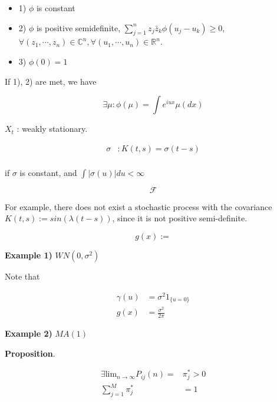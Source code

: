 \documentclass[12pt]{article}
\theoremstyle{nonumberbreak}
\begin{document}
\begin{itemize}
	\item 1) $\phi$ is constant
	\item 2) $\phi$ is positive semidefinite, $\sum_{j=1}^n z_j \bar{z}_k \phi(u_j - u_k) \ge 0$, $\forall (z_1, \cdots, z_n) \in \mathbb{C}^n, \forall (u_1, \cdots, u_n) \in \mathbb{R}^n$.
	\item 3) $\phi(0) = 1$
\end{itemize}

If 1), 2) are met, we have 

$$
\exists \mu: \phi(\mu) = \int e^{iux} \mu (dx)
$$






$X_t$ : weakly stationary. 

$$
\begin{aligned}
\sigma &: K(t,s) = \sigma(t-s) \\[8pt]
\end{aligned}
$$

if $\sigma$ is constant, and $\int |\sigma (u)| du < \infty $ 

$$
\mathcal{F}
$$


For example, there does not exist a stochastic process with the covariance $K(t,s) := sin( \lambda (t-s) )$, since it is not positive semi-definite.


$$
g(x) := 
$$


\textbf{Example 1)} $WN(0, \sigma^2)$

Note that 

$$
\begin{aligned}
\gamma(u) &= \sigma^2 1_{\{ u = 0 \}} \\[8pt]
g(x) &= \frac{\sigma^2}{2\pi}
\end{aligned}
$$



\textbf{Example 2)} $MA(1)$



\begin{theorem}
\textbf{Proposition}. 

$$
\begin{aligned}
\exists \mathrm{lim}_{n\to\infty} P_{ij}(n) =& \pi_j^\ast > 0 \\[8pt]
\sum_{j=1}^M \pi_j^\ast &= 1
\end{aligned}
$$

\end{theorem}
\end{document}
